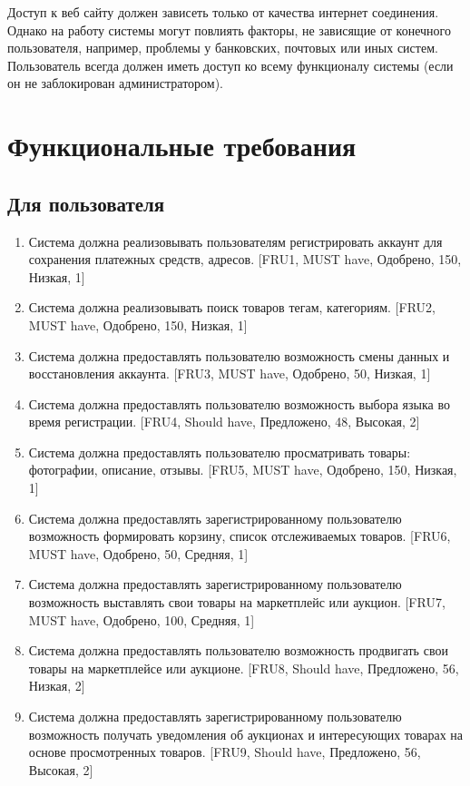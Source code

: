 \documentclass{article}
\begin{document}
Доступ к веб сайту должен зависеть только от качества интернет соединения. Однако на работу системы могут повлиять факторы, не зависящие от конечного пользователя, например, проблемы у банковских, почтовых или иных систем. Пользователь всегда должен иметь доступ ко всему функционалу системы (если он не заблокирован администратором).

\section{Функциональные требования}

\subsection{Для пользователя}

\begin{enumerate}
    \item Система должна реализовывать пользователям регистрировать аккаунт для сохранения платежных средств, адресов. [FRU1, MUST have, Одобрено, 150, Низкая, 1] 
    \item Система должна реализовывать поиск товаров тегам, категориям. [FRU2, MUST have, Одобрено, 150, Низкая, 1]
    \item Система должна предоставлять пользователю возможность смены данных и восстановления аккаунта. [FRU3, MUST have, Одобрено, 50, Низкая, 1]
    \item Система должна предоставлять пользователю возможность выбора языка во время регистрации. [FRU4, Should have, Предложено, 48, Высокая, 2]
    \item Система должна предоставлять пользователю просматривать товары: фотографии, описание, отзывы. [FRU5, MUST have, Одобрено, 150, Низкая, 1]
    \item Система должна предоставлять зарегистрированному пользователю возможность формировать корзину, список отслеживаемых товаров. [FRU6, MUST have, Одобрено, 50, Средняя, 1]
    \item Система должна предоставлять зарегистрированному пользователю возможность выставлять свои товары на маркетплейс или аукцион. [FRU7, MUST have, Одобрено, 100, Средняя, 1]
    \item Система должна предоставлять пользователю возможность продвигать свои товары на маркетплейсе или аукционе. [FRU8, Should have, Предложено, 56, Низкая, 2]
    \item Система должна предоставлять зарегистрированному пользователю возможность получать уведомления об аукционах и интересующих товарах на основе просмотренных товаров. [FRU9, Should have, Предложено, 56, Высокая, 2]

\end{enumerate}
\end{document}
